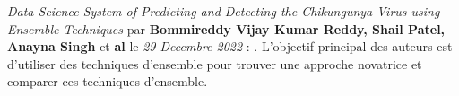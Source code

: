  \textit{Data Science System of Predicting and Detecting the Chikungunya Virus using Ensemble Techniques} par \textbf{Bommireddy Vijay Kumar Reddy, Shail Patel, Anayna Singh } et \textbf{al} le \textit{29 Decembre 2022} : . L'objectif principal des auteurs est d'utiliser des techniques d'ensemble pour trouver une approche novatrice et comparer ces techniques d'ensemble.
 
